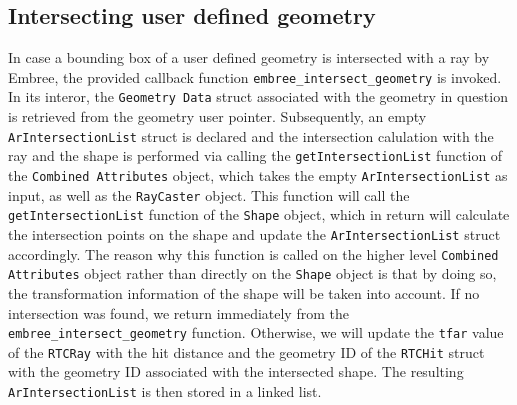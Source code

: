 \subsection{Intersecting user defined geometry}
\label{subsec:instersect}

In case a bounding box of a user defined geometry is intersected with a ray by Embree, the provided callback function \texttt{embree\_intersect\_geometry} is invoked. In its interor, the \texttt{Geometry Data} struct associated with the geometry in question is retrieved from the geometry user pointer. Subsequently, an empty \texttt{ArIntersectionList}  struct is declared and the intersection calulation with the ray and the shape is performed via calling the \texttt{getIntersectionList} function of the \texttt{Combined Attributes} object, which takes the empty \texttt{ArIntersectionList} as input, as well as the \texttt{RayCaster} object. This function will call the \texttt{getIntersectionList} function of the \texttt{Shape} object, which in return will calculate the intersection points on the shape and update the \texttt{ArIntersectionList} struct accordingly. The reason why this function is called on the higher level \texttt{Combined Attributes} object rather than directly on the \texttt{Shape} object is that by doing so, the transformation information of the shape will be taken into account.
If no intersection was found, we return immediately from the \texttt{embree\_intersect\_geometry} function. Otherwise, we will update the \texttt{tfar} value of the \texttt{RTCRay} with the hit distance and the geometry ID of the \texttt{RTCHit} struct with the geometry ID associated with the intersected shape. 
The resulting \texttt{ArIntersectionList} is then stored in a linked list. 

